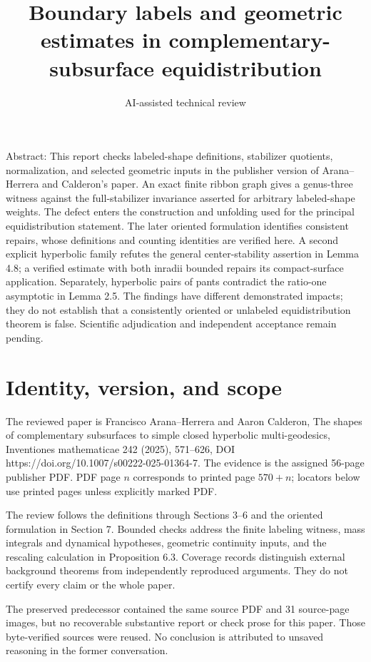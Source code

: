 \documentclass[10pt]{article}
\title{Boundary labels and geometric estimates in complementary-subsurface equidistribution}
\author{AI-assisted technical review}
\date{}
\begin{document}
\maketitle
Abstract: This report checks labeled-shape definitions, stabilizer quotients, normalization, and selected geometric inputs in the publisher version of Arana–Herrera and Calderon’s paper. An exact finite ribbon graph gives a genus-three witness against the full-stabilizer invariance asserted for arbitrary labeled-shape weights. The defect enters the construction and unfolding used for the principal equidistribution statement. The later oriented formulation identifies consistent repairs, whose definitions and counting identities are verified here. A second explicit hyperbolic family refutes the general center-stability assertion in Lemma 4.8; a verified estimate with both inradii bounded repairs its compact-surface application. Separately, hyperbolic pairs of pants contradict the ratio-one asymptotic in Lemma 2.5. The findings have different demonstrated impacts; they do not establish that a consistently oriented or unlabeled equidistribution theorem is false. Scientific adjudication and independent acceptance remain pending.\par
\section*{Identity, version, and scope}
The reviewed paper is Francisco Arana–Herrera and Aaron Calderon, The shapes of complementary subsurfaces to simple closed hyperbolic multi-geodesics, Inventiones mathematicae 242 (2025), 571–626, DOI https://doi.org/10.1007/s00222-025-01364-7. The evidence is the assigned 56-page publisher PDF. PDF page \(n\) corresponds to printed page \(570+n\); locators below use printed pages unless explicitly marked PDF.\par
The review follows the definitions through Sections 3–6 and the oriented formulation in Section 7. Bounded checks address the finite labeling witness, mass integrals and dynamical hypotheses, geometric continuity inputs, and the rescaling calculation in Proposition 6.3. Coverage records distinguish external background theorems from independently reproduced arguments. They do not certify every claim or the whole paper.\par
The preserved predecessor contained the same source PDF and 31 source-page images, but no recoverable substantive report or check prose for this paper. Those byte-verified sources were reused. No conclusion is attributed to unsaved reasoning in the former conversation.\par
\end{document}
